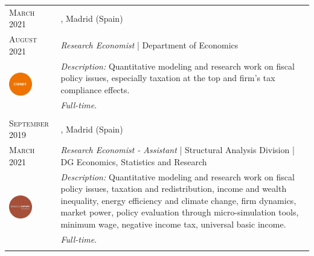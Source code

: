 \begin{longtable}{R{2.5cm}|p{14.8cm}}
 	 	\textsc{March 2021} & \textsc{}, \faMapMarker \hspace{0.5 mm} Madrid (Spain) \\
 	\textsc{August 2021} 	& \textit{Research Economist} | Department of Economics \\
	 & 
 	\footnotesize{\faTasks \emph{ Description: }Quantitative modeling and research work on fiscal policy issues, especially taxation at the top and firm’s tax compliance effects.} \\ &
	\footnotesize{\faFileText \emph{ Full-time}}. \\
 	 \\
	
 	 	\textsc{September 2019} & \textsc{}, \faMapMarker \hspace{0.5 mm} Madrid (Spain) \\
 	\textsc{March 2021} 	& \textit{Research Economist - Assistant} | Structural Analysis Division | DG Economics, Statistics and Research  \\
	 & 
 	\footnotesize{\faTasks \emph{ Description: }Quantitative modeling and research work on fiscal policy issues, taxation and redistribution, income and wealth inequality, energy efficiency and climate change, firm dynamics, market power, policy evaluation through micro-simulation tools, minimum wage, negative income tax, universal basic income.} \\ &
	\footnotesize{\faFileText \emph{ Full-time}.} \\
 	 \\
	

\end{longtable}
